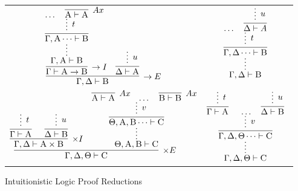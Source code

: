 \begin{figure}
	\begin{tabularx}{0.95\textwidth}{@{}c@{~$\implies$~}c@{}}
	$\infer[\to E]{\Gamma, \Delta \vdash \prop{B}}{
	\infer[\to I]{\Gamma \vdash \prop{A} \to \prop{B}}{
		\infer*[]{\Gamma, \prop{A} \vdash \prop{B}}{
			\infer[]{\Gamma, \prop{A} \dots \vdash \prop{B}}{
					\infer*[t]{}{\dots & \infer[Ax]{\prop{A} \vdash \prop{A}}{}}
				}
			}
		}
		&
		\infer{\Delta \vdash \prop{A}}{
			\infer*[u]{}{}
		}
	}$
	&
	$ 
	\infer*[]{\Gamma, \Delta \vdash \prop{B}}{
		\infer[]{\Gamma, \Delta \dots \vdash \prop{B}}{
			\infer*[t]{}{
			\dots &
			\infer[]{\Delta \vdash A}{
				\infer*[u]{}{}
			}}
		}
	}
	$\\[2em]
	$
	\infer[\times E]{\Gamma, \Delta, \Theta \vdash \prop{C}}{
		\infer[\times I]{\Gamma, \Delta \vdash \prop{A} \times \prop{B}}{
			\infer[]{\Gamma \vdash \prop{A}}{\infer*[t]{}{}}
			&
			\infer[]{\Delta \vdash \prop{B}}{\infer*[u]{}{}}
		}		
		&
		\infer*[]{\Theta, \prop{A}, \prop{B} \vdash \prop{C}}{
			\infer[]{\Theta, \prop{A}, \prop{B}\dots \vdash \prop{C}}{
				\infer*[v]{}{
					\infer[Ax]{\prop{A} \vdash \prop{A}}{
					}
					&
					\dots
					&
					\infer[Ax]{\prop{B} \vdash \prop{B}}{}
				}
			}
		}
	}
	$
	&
	$
	\infer*[]{\Gamma, \Delta, \Theta \vdash \prop{C}}{
		\infer[]{\Gamma, \Delta, \Theta \dots \vdash \prop{C}}{
			\infer*[v]{}{
				\infer[]{\Gamma \vdash \prop{A}}{
					\infer*[t]{}{}
				}
				&
				\dots 
				&
				\infer[]{\Delta \vdash \prop{B}}{
					\infer*[u]{}{}
				}
			}
		}
	} 
	$
	\end{tabularx}
	\caption{Intuitionistic Logic Proof Reductions}
	\label{figure:intuitionistic_proof_reduction}
\end{figure}


